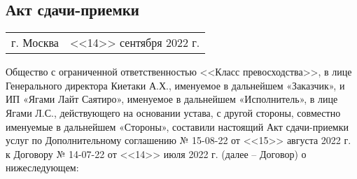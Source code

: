 \documentclass[11pt]{report}
\begin{document}
%
\begin{spacing}{1.5}
\normalsize%
\sectionfont{\fontsize{11}{11}\selectfont\MakeUppercase}
\section*{\hfil Акт сдачи-приемки\hfil}%
%
	\setlength{\parindent}{0cm}
	\setlength{\tabcolsep}{0pt}
	\begin{tabular}{ 
		p{125mm}
		p{40mm}}
	г. Москва & <<14>> сентября 2022 г.\\%
	\end{tabular}
\end{spacing}
%
\setlength{\parindent}{0.7cm}

Общество с ограниченной ответственностью <<Класс превосходства>>, в лице Генерального директора
Киетаки А.Х., именуемое в дальнейшем «Заказчик», и ИП «Ягами Лайт Саятиро»,
именуемое в дальнейшем «Исполнитель», в лице Ягами Л.С., действующего
на основании устава, с другой стороны, совместно именуемые в дальнейшем «Стороны»,
составили настоящий Акт сдачи-приемки услуг по Дополнительному соглашению № 15-08-22 от
<<15>> августа 2022 г. к Договору № 14-07-22 от <<14>> июля 2022 г. (далее – Договор) о
нижеследующем:
%
\end{document}
